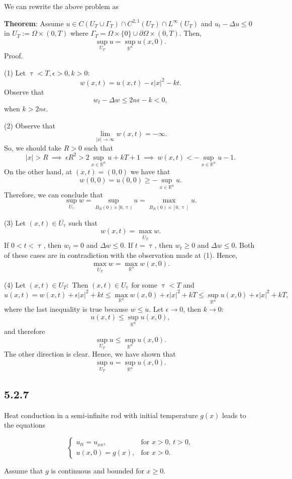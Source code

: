 \documentclass{article}
\begin{document}
We can rewrite the above problem as 

\textbf{Theorem}: Assume $u\in C(U_T\cup\Gamma_T)\cap C^{2,1}(U_T)\cap L^{\infty}(U_T)$ and $u_t-\Delta u \leq 0$ in $U_T:=\Omega\times(0,T)$ where $\Gamma_T=\Omega\times\{0\}\cup\partial\Omega\times(0,T)$. Then,
$$\sup_{U_T} u=\sup_{\mathbb R^n} u(x,0).$$
Proof.

(1) Let $\uptau<T,\epsilon>0, k>0:$
$$w(x,t)=u(x,t)-\epsilon|x|^2-kt.$$
Observe that
$$w_t-\Delta w\leq 2n\epsilon - k<0,$$
when $k>2n\epsilon$.

(2) Observe that
$$\lim_{|x|\to\infty}w(x,t)=-\infty.$$
So, we should take $R>0$ such that
$$|x|>R ~\implies~ \epsilon R^2 > 2\sup_{x\in\mathbb R^n} u + kT+1 ~\implies~ w(x,t) < - \sup_{x\in\mathbb R^n} u -1 .$$
On the other hand, at $(x,t)=(0,0)$ we have that
$$w(0,0)=u(0,0)\geq -\sup_{x\in\mathbb R^n} u.$$
Therefore, we can conclude that
$$\sup_{U_{\uptau}} w =\sup_{B_R(0)\times[0,\uptau)} u=\max_{\overline{B_R(0)}\times[0,\uptau]} u.$$

(3) Let $(x,t)\in\overline{U_\uptau}$ such that
$$w(x,t)=\max_{\overline{U}_T} w.$$
If $0<t<\uptau$, then $w_t=0$ and $\Delta w \leq 0$. If $t=\uptau$, then $w_t\geq 0$ and $\Delta w \leq 0$. Both of these cases are in contradiction with the observation made at (1). Hence,
$$\max_{\overline{U}_T} w=\max_{\mathbb R^n} w(x,0).$$

(4) Let $(x,t)\in U_T:$ Then $(x,t)\in U_{\uptau}$ for some $\uptau < T$ and 
$$u(x,t)=w(x,t)+\epsilon|x|^2+kt\leq \max_{\mathbb R^n} w(x,0)+\epsilon|x|^2+kT\leq\sup_{\mathbb R^n} u(x,0)+\epsilon|x|^2+kT,$$
where the last inequality is true because $w\leq u$. Let $\epsilon\to 0$, then $k\to 0$:
$$u(x,t)\leq \sup_{\mathbb R^n} u(x,0),$$
and therefore
$$\sup_{U_T} u\leq \sup_{\mathbb R^n} u(x,0).$$
The other direction is clear. Hence, we have shown that $$\sup_{U_T} u=\sup_{\mathbb R^n} u(x,0).$$

\subsection{\textbf{5.2.7}} Heat conduction in a semi-infinite rod with initial temperature $g(x)$ leads to the equations

\[
  \begin{cases}
  u_{tt}=u_{xx},  &\text{for $x>0$, $t>0$}, \\
  u(x,0)=g(x),& \text{for $x>0$}. 
  \end{cases}
\]

Assume that $g$ is continuous and bounded for $x\geq 0$.
\end{document}

